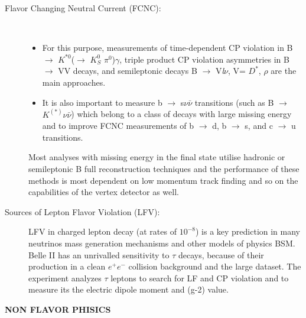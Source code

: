 \begin{description}
\item[Flavor Changing Neutral Current (FCNC):]\
	\begin{itemize}
	\item For this purpose, measurements of time-dependent CP violation in B $\rightarrow$ $K^{*0}$($\rightarrow$ $K^{0}_{S}$ $\pi^{0}$)$\gamma$, triple product CP violation asymmetries in B $\rightarrow$ VV decays, and semileptonic decays B $\rightarrow$ V\textit{l}$\nu$, V= $D^{*}$, $\rho$ are the main approaches. 
	\item It is also important to measure b $\rightarrow$ s$\nu\bar{\nu}$ transitions (such as B $\rightarrow$ $K^{(*)}\nu \bar{\nu}$) which belong to a class of decays with large missing energy and to improve FCNC measurements of b $\rightarrow$ d, b $\rightarrow$ s, and c $\rightarrow$ u transitions. 
	\end{itemize}
	
Most analyses with missing energy in the final state utilise hadronic or semileptonic B full reconstruction techniques and the performance of these methods is most dependent on low momentum track finding and so on the capabilities of the vertex detector as well.

\item [Sources of Lepton Flavor Violation (LFV):] LFV in charged lepton decay (at rates of $10^{-8}$) is a key prediction in many neutrinos mass generation mechanisms and other models of physics BSM. Belle II has an unrivalled sensitivity to $\tau$ decays, because of their production in a clean $e^{+}e^{-}$ collision background and the large dataset. The experiment analyzes $\tau$ leptons to search for LF and CP violation and to measure its the electric dipole moment and (g-2) value.

\end{description}


\hspace{.2cm}

\textbf{NON FLAVOR PHISICS}

